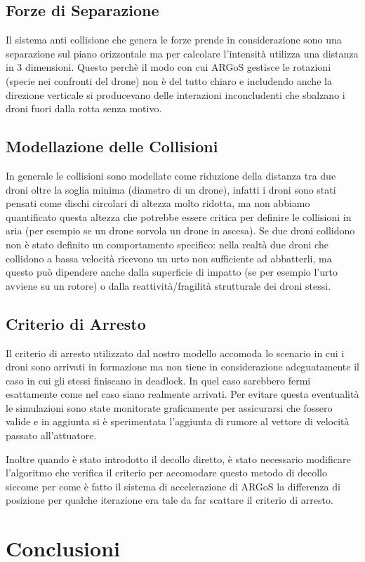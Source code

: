 \documentclass[a4paper,11pt,oneside, table]{article}
\begin{document}
\subsection{Forze di Separazione}

Il sistema anti collisione che genera le forze prende in considerazione sono una separazione sul piano orizzontale ma per calcolare l'intensit\`a utilizza una distanza in 3 dimensioni.
Questo perch\`e il modo con cui ARGoS gestisce le rotazioni (specie nei confronti del drone) non \`e del tutto chiaro e includendo anche la direzione verticale si producevano delle interazioni inconcludenti che sbalzano i droni fuori dalla rotta senza motivo.

\subsection{Modellazione delle Collisioni}

In generale le collisioni sono modellate come riduzione della distanza tra due droni oltre la soglia minima (diametro di un drone), infatti i droni sono stati pensati come dischi circolari di altezza molto ridotta, ma non abbiamo quantificato questa altezza che potrebbe essere critica per definire le collisioni in aria (per esempio se un drone sorvola un drone in ascesa).
Se due droni collidono non \`e stato definito un comportamento specifico: nella realt\`a due droni che collidono a bassa velocit\`a ricevono un urto non sufficiente ad abbatterli, ma questo pu\`o dipendere anche dalla superficie di impatto (se per esempio l'urto avviene su un rotore) o dalla reattivit\`a/fragilit\`a strutturale dei droni stessi.

\subsection{Criterio di Arresto}

Il criterio di arresto utilizzato dal nostro modello accomoda lo scenario in cui i droni sono arrivati in formazione ma non tiene in considerazione adeguatamente il caso in cui gli stessi finiscano in deadlock.
In quel caso sarebbero fermi esattamente come nel caso siano realmente arrivati. Per evitare questa eventualit\`a le simulazioni sono state monitorate graficamente per assicurarsi che fossero valide e in aggiunta si \`e sperimentata l'aggiunta di rumore al vettore di velocit\`a passato all'attuatore.

Inoltre quando \`e stato introdotto il decollo diretto, \`e stato necessario modificare l'algoritmo che verifica il criterio per accomodare questo metodo di decollo siccome per come \`e fatto il sistema di accelerazione di ARGoS la differenza di posizione per qualche iterazione era tale da far scattare il criterio di arresto.

\section{Conclusioni}

\printbibliography[title={Bibliografia}]
\end{document}
